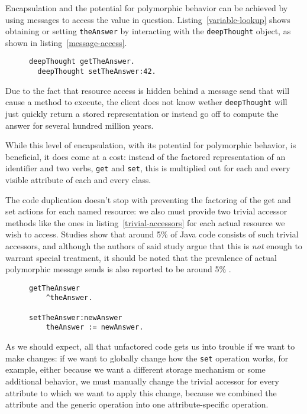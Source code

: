 \documentclass[preprint,authoryear]{acm_proc_article-sp}
\newcommand\mpw[1]{\mynote{Marcel}{#1}}
\begin{document}
Encapsulation and the potential for polymorphic behavior can be achieved by using
messages to access the value in question.  Listing~\ref{variable-lookup} shows 
obtaining or setting {\tt theAnswer} by interacting with the {\tt deepThought}\cite{adams1997hitchhiker} object,
as shown in listing~\ref{message-access}.

\begin{figure}[htbp]
\begin{lstlisting}[style=L,label=message-access,caption=Asking an object.]
  deepThought getTheAnswer.
  deepThought setTheAnswer:42.
\end{lstlisting}
\end{figure}

Due to the fact that resource access is hidden behind a message send that will cause
a method to execute, the client does not know wether {\tt deepThought} will just
quickly return a stored representation or instead go off to compute the answer for 
several hundred million years. 

While this level of encapsulation, with its potential for polymorphic behavior, is 
beneficial, it does come at a cost:   instead of the factored 
representation of an identifier and two verbs, {\tt get} and {\tt set},
this is multiplied out for each and every visible attribute of 
each and every class. 
 
The code duplication doesn't stop with preventing the factoring of the get and set 
actions for each
named resource:  we also 
must provide two trivial accessor methods like the ones in listing~\ref{trivial-accessors} for each actual resource we wish
to access.  Studies show that around 5\% of Java code consists of such trivial accessors\cite{Spinellis:2002:MPC:510857.510868}, and although the authors of said study argue that this is {\em not} enough
to warrant special treatment, it should be noted that the prevalence of actual polymorphic 
message sends is also reported to be around 5\% \cite{Holzle:1991:ODO:646149.679193}.

\begin{figure}[htbp]
\begin{lstlisting}[style=L,label=trivial-accessors,caption=Trivial accessors.]
getTheAnswer
    ^theAnswer.

setTheAnswer:newAnswer
    theAnswer := newAnswer.

\end{lstlisting}
\end{figure}

As we should expect, all that unfactored code gets us into trouble if we want 
to make changes:   if we want to globally change how the {\tt set}
operation works, for example, either because we want a different storage
mechanism or some additional behavior,
we must manually change the trivial accessor for every attribute to which
we want to apply this change, because we combined the attribute and
the generic operation into one attribute-specific operation.
\mpw{a little cumbersome}
\end{document}
